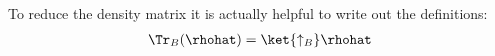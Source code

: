 To reduce the density matrix it is actually helpful to write out the definitions:
\begin{align}
\Tr_B(\rhohat) = \ket{\uparrow_B}\rhohat
\end{align}